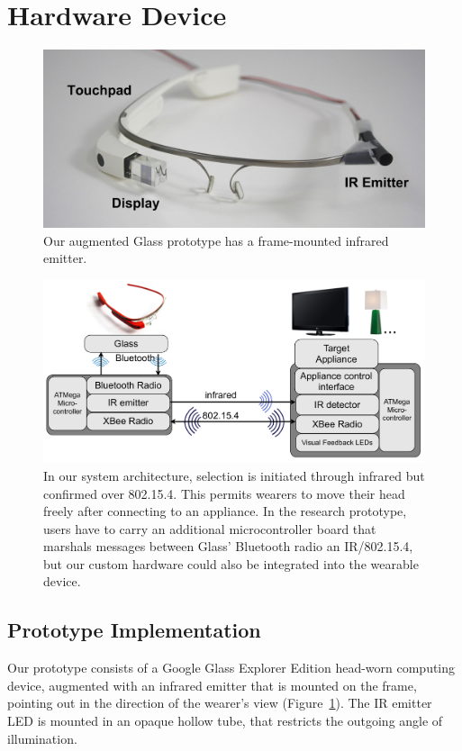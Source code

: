 \documentclass{sigchi}
\begin{document}

\section{Hardware Device}
\begin{figure}[t]
\centering
\includegraphics[width=1.0\columnwidth]{figures/glass-with-ir}
\caption{Our augmented Glass prototype has a frame-mounted infrared emitter.}
\label{fig:glass}
\end{figure}
\begin{figure}[t]
\centering
\includegraphics[width=1.0\columnwidth]{figures/architecture}
\caption{In our system architecture, selection is initiated through infrared but confirmed over 802.15.4. This permits wearers to move their head freely after connecting to an appliance. In the research prototype, users have to carry an additional microcontroller board that marshals messages between Glass' Bluetooth radio an IR/802.15.4, but our custom hardware could also be integrated into the wearable device.}
\label{fig:architecture}
\end{figure}

\subsection{Prototype Implementation}
Our prototype consists of a Google Glass Explorer Edition head-worn computing device, augmented with an infrared emitter that is mounted on the frame, pointing out in the direction of the wearer's view (Figure~\ref{fig:glass}). The IR emitter LED is mounted in an opaque hollow tube, that restricts the outgoing angle of illumination. 
\end{document}
